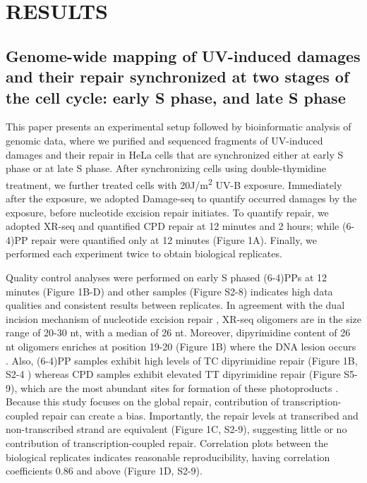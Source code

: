 \setlength{\parindent}{0pt}
\chapter{\bf RESULTS}

\section{Genome-wide mapping of UV-induced damages and their repair synchronized at two stages of the cell cycle: early S phase, and late S phase}

This paper presents an experimental setup followed by bioinformatic analysis of genomic data, where we purified and sequenced fragments of UV-induced damages and their repair in HeLa cells that are synchronized either at early S phase or at late S phase. After synchronizing cells using double-thymidine treatment, we further treated cells with 20J/m\textsuperscript{2} UV-B exposure. Immediately after the exposure, we adopted Damage-seq to quantify occurred damages by the exposure, before nucleotide excision repair initiates. To quantify repair, we adopted XR-seq and quantified CPD repair at 12 minutes and 2 hours; while (6-4)PP repair were quantified only at 12 minutes (Figure 1A). Finally, we performed each experiment twice to obtain biological replicates. 

Quality control analyses were performed on early S phased (6-4)PPs at 12 minutes (Figure 1B-D) and other samples (Figure S2-8) indicates high data qualities and consistent results between replicates. In agreement with the dual incision mechanism of nucleotide excision repair \citep{huang1992human,li2017human,reardon2005nucleotide}, XR-seq oligomers are in the size range of 20-30 nt, with a median of 26 nt. Moreover, dipyrimidine content of 26 nt oligomers enriches at position 19-20 (Figure 1B) where the DNA lesion occurs \citep{huang1992human}. Also, (6-4)PP samples exhibit high levels of TC dipyrimidine repair (Figure 1B, S2-4 ) whereas CPD samples exhibit elevated TT dipyrimidine repair (Figure S5-9), which are the most abundant sites for formation of these photoproducts \citep{mouret2010uva}. Because this study focuses on the global repair, contribution of transcription-coupled repair can create a bias. Importantly, the repair levels at transcribed and non-transcribed strand are equivalent (Figure 1C, S2-9), suggesting little or no contribution of transcription-coupled repair. Correlation plots between the biological replicates indicates reasonable reproducibility, having correlation coefficients 0.86 and above (Figure 1D, S2-9). 

